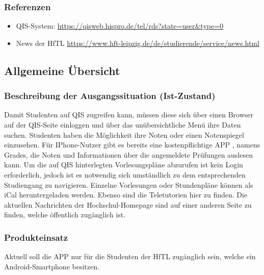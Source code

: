 \subsubsection{\textbf{Referenzen}}

\begin{itemize}		
	\item QIS-System:  \url{https://qisweb.hispro.de/tel/rds?state=user&type=0} 
	
	\item News der HfTL  \url{https://www.hft-leipzig.de/de/studierende/service/news.html}	
\end{itemize}


\subsection{Allgemeine Übersicht}

\subsubsection{\textbf{Beschreibung der Ausgangssituation (Ist-Zustand) }}

Damit Studenten auf \acs{QIS} zugreifen kann, müssen diese sich über einen Browser auf der \acs{QIS}-Seite einloggen und über das unübersichtliche Menü ihre Daten suchen.
Studenten haben die Möglichkeit ihre Noten oder einen Notenspiegel einzusehen.
Für IPhone-Nutzer gibt es bereits eine kostenpflichtige \acs{APP} , namens Grades, die Noten und Informationen über die angemeldete Prüfungen auslesen kann.
Um die auf \acs{QIS} hinterlegten Vorlesungspläne abzurufen ist kein Login erforderlich, jedoch ist es notwendig sich umständlich zu dem entsprechenden Studiengang zu navigieren. Einzelne Vorlesungen oder Stundenpläne können als \acs{iCal} heruntergeladen werden.
Ebenso sind die Teletutorien hier zu finden.
Die aktuellen Nachrichten der Hochschul-Homepage sind auf einer anderen Seite zu finden, welche öffentlich zugänglich ist.


\subsubsection{\textbf{Produkteinsatz}}

Aktuell soll die APP nur für die Studenten der \acs{HfTL} zugänglich sein, welche ein Android-Smartphone besitzen. 


